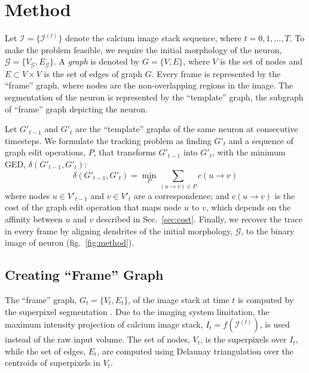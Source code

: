 \documentclass{article}
\begin{document}
\section{Method}
Let $\mathcal{I} = \{ \mathcal{I}^{(t)} \}$ denote the calcium image stack sequence, where $t = 0,1,\dots,T$. To make the problem feasible, we require the initial morphology of the neuron, $\mathcal{G} = \{ V_\mathcal{G}, E_\mathcal{G} \}$. A \emph{graph} is denoted by $G = \{V, E\}$, where $V$ is the set of nodes and $E \subset V \times V$ is the set of edges of graph $G$. Every frame is represented by the ``frame'' graph, where nodes are the non-overlapping regions in the image. The segmentation of the neuron is represented by the ``template'' graph, the subgraph of ``frame'' graph depicting the neuron.

Let $G'_{t-1}$ and $G'_t$ are the ``template'' graphs of the same neuron at consecutive timesteps. We formulate the tracking problem as finding $G'_t$ and a sequence of graph edit operations, $P$, that transforms $G'_{t-1}$ into $G'_t$, with the minimum GED, $\delta(G'_{t-1}, G'_t)$:
\begin{equation} \label{eq:ged}
\delta(G'_{t-1}, G'_t) = \min_P \sum_{(u \rightarrow v) \in P} c(u \rightarrow v)
\end{equation}
where nodes $u \in V'_{t-1}$ and $v \in V'_t$ are a correspondence; and $c(u \rightarrow v)$ is the cost of the graph edit operation that maps node $u$ to $v$, which depends on the affinity between $u$ and $v$ described in Sec.~\ref{sec:cost}. Finally, we recover the trace in every frame by aligning dendrites of the initial morphology, $\mathcal{G}$, to the binary image of neuron (fig.~\ref{fig:method}).



\subsection{Creating ``Frame'' Graph}
The ``frame'' graph, $G_t = \{ V_t, E_t \}$, of the image stack at time $t$ is computed by the superpixel segmentation \cite{Li2015, Chen2017}. Due to the imaging system limitation, the maximum intensity projection of calcium image stack, $I_t = f(\mathcal{I}^{(t)})$, is used instead of the raw input volume. The set of nodes, $V_t$, is the superpixels over $I_t$, while the set of edges, $E_t$, are computed using Delaunay triangulation over the centroids of superpixels in $V_t$.
\end{document}
